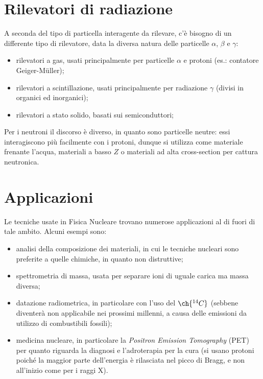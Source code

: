 
\section{Rilevatori di radiazione}

A seconda del tipo di particella interagente da rilevare, c'è bisogno di un differente tipo di rilevatore, data la diversa natura delle particelle $ \alpha $, $ \beta $ e $ \gamma $:
\begin{itemize}
	\item rilevatori a gas, usati principalmente per particelle $ \alpha $ e protoni (es.: contatore Geiger-Müller);
	\item rilevatori a scintillazione, usati principalmente per radiazione $ \gamma $ (divisi in organici ed inorganici);
	\item rilevatori a stato solido, basati sui semiconduttori;
\end{itemize}
Per i neutroni il discorso è diverso, in quanto sono particelle neutre: essi interagiscono più facilmente con i protoni, dunque si utilizza come materiale frenante l'acqua, materiali a basso $ Z $ o materiali ad alta cross-section per cattura neutronica.

\section{Applicazioni}

Le tecniche usate in Fisica Nucleare trovano numerose applicazioni al di fuori di tale ambito. Alcuni esempi sono:
\begin{itemize}
	\item analisi della composizione dei materiali, in cui le tecniche nucleari sono preferite a quelle chimiche, in quanto non distruttive;
	\item spettrometria di massa, usata per separare ioni di uguale carica ma massa diversa;
	\item datazione radiometrica, in particolare con l'uso del $ \ch{^{14} C} $ (sebbene diventerà non applicabile nei prossimi millenni, a causa delle emissioni da utilizzo di combustibili fossili);
	\item medicina nucleare, in particolare la \textit{Positron Emission Tomography} (PET) per quanto riguarda la diagnosi e l'adroterapia per la cura (si usano protoni poiché la maggior parte dell'energia è rilasciata nel picco di Bragg, e non all'inizio come per i raggi X).
\end{itemize}
